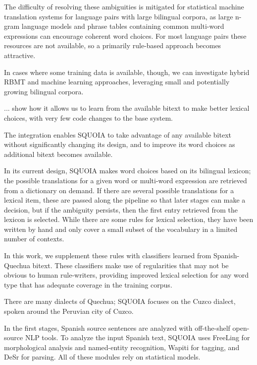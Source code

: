 The difficulty of resolving these ambiguities is mitigated for 
statistical machine translation systems for language pairs with large bilingual
corpora, as large n-gram language models and phrase tables containing common
multi-word expressions can encourage coherent word choices.
For most language pairs these resources are not available, so a primarily
rule-based approach becomes attractive.

In cases where some training data is available, though, we can
investigate hybrid RBMT and machine learning approaches, leveraging small and
potentially growing bilingual corpora.

... show how it allows us to learn from the available bitext to
make better lexical choices, with very few code changes to the base system.

The integration enables SQUOIA to take advantage of any available bitext
without significantly changing its design, and to improve its word choices as
additional bitext becomes available.

In its current design, SQUOIA makes word choices based on its bilingual
lexicon; the possible translations for a given word or multi-word expression
are retrieved from a dictionary on demand. If there are several possible
translations for a lexical item, these are passed along the pipeline so
that later stages can make a decision, but if the ambiguity persists,
then the first entry retrieved from the lexicon is selected. While there are
some rules for lexical selection, they have been written by hand and only cover
a small subset of the vocabulary in a limited number of contexts.

In this work, we supplement these rules with classifiers learned from
Spanish-Quechua bitext.  These classifiers make use of regularities that may not
be obvious to human rule-writers, providing improved lexical selection for
any word type that has adequate coverage in the training corpus.

There are many dialects of Quechua; SQUOIA focuses on the
Cuzco dialect, spoken around the Peruvian city of Cuzco.

In the first stages, Spanish source sentences are analyzed with off-the-shelf
open-source NLP tools. To analyze the input Spanish text,
SQUOIA uses FreeLing \cite{padro12} for morphological analysis and named-entity
recognition,
Wapiti \cite{lavergne2010practical} for tagging,
and DeSr \cite{attardi-EtAl:2007:EMNLP-CoNLL2007} for parsing.
All of these modules rely on statistical models.


